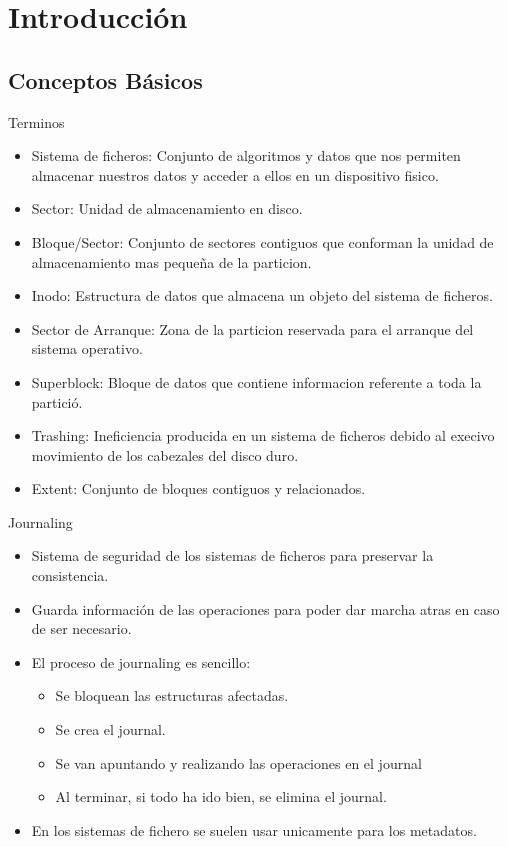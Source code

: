 \section*{Introducción}
\subsection*{Conceptos Básicos}
\begin{frame}{Terminos}
  \begin{itemize}
    \item Sistema de ficheros: Conjunto de algoritmos y datos que nos permiten almacenar nuestros datos y acceder a ellos en un dispositivo fisico.
    \item Sector: Unidad de almacenamiento en disco.
    \item Bloque/Sector: Conjunto de sectores contiguos que conforman la unidad de almacenamiento mas pequeña de la particion.
    \item Inodo: Estructura de datos que almacena un objeto del sistema de ficheros.
    \item Sector de Arranque: Zona de la particion reservada para el arranque del sistema operativo.
    \item Superblock: Bloque de datos que contiene informacion referente a toda la partició.
    \item Trashing: Ineficiencia producida en un sistema de ficheros debido al execivo movimiento de los cabezales del disco duro.
    \item Extent: Conjunto de bloques contiguos y relacionados.
  \end{itemize}
\end{frame}

\begin{frame}{Journaling}
  \begin{itemize}
    \item Sistema de seguridad de los sistemas de ficheros para preservar la consistencia.
    \item Guarda información de las operaciones para poder dar marcha atras en caso de ser necesario.
    \item El proceso de journaling es sencillo:
    \begin{itemize}
      \item Se bloquean las estructuras afectadas.
      \item Se crea el journal.
      \item Se van apuntando y realizando las operaciones en el journal
      \item Al terminar, si todo ha ido bien, se elimina el journal.
    \end{itemize}
    \item En los sistemas de fichero se suelen usar unicamente para los metadatos.
  \end{itemize}
\end{frame}

